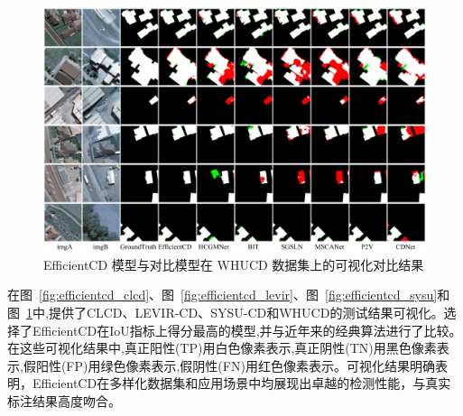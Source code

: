 \begin{figure}[!htbp]
  \centering
  \includegraphics[width=\textwidth]{paper_figures/基于双时相遥感影像特征交互的变化检测算法研究/EfficientCD/efficientcd_whucd.png}
  \caption{EfficientCD 模型与对比模型在 WHUCD 数据集上的可视化对比结果}
  \label{fig:efficientcd_whucd}
\end{figure}

在图~\ref{fig:efficientcd_clcd}、图~\ref{fig:efficientcd_levir}、图~\ref{fig:efficientcd_sysu}和图~\ref{fig:efficientcd_whucd}中,提供了CLCD、LEVIR-CD、SYSU-CD和WHUCD的测试结果可视化。选择了EfficientCD在IoU指标上得分最高的模型,并与近年来的经典算法进行了比较。在这些可视化结果中,真正阳性(TP)用白色像素表示,真正阴性(TN)用黑色像素表示,假阳性(FP)用绿色像素表示,假阴性(FN)用红色像素表示。可视化结果明确表明，EfficientCD在多样化数据集和应用场景中均展现出卓越的检测性能，与真实标注结果高度吻合。

